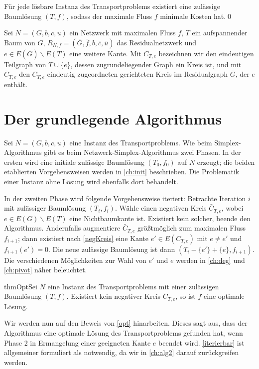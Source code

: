 \begin{kor}\label{TP}Für jede lösbare Instanz des Transportproblems existiert eine zulässige Baumlösung $(T,f)$, sodass der maximale Fluss $f$ minimale Kosten hat.\qed\end{kor}

\begin{nota}Sei $N=(G,b,c,u)$ ein Netzwerk mit maximalen Fluss $f$, $T$ ein aufspannender Baum von $G$, $R_{N,f}=(\bar{G},\bar{f},b,\bar{c},\bar{u})$ das Residualnetzwerk und $e\in E(\bar{G})\backslash E(T)$ eine weitere Kante. Mit $C_{T,e}$ bezeichnen wir den eindeutigen Teilgraph von $T\cup\{e\}$, dessen zugrundeliegender Graph ein Kreis ist, und mit $\bar{C}_{T,e}$ den $C_{T,e}$ eindeutig zugeordneten gerichteten Kreis im Residualgraph $\bar{G}$, der $e$ enthält.\end{nota}

\section{Der grundlegende Algorithmus}\label{ch:alg}

Sei $N=(G,b,c,u)$ eine Instanz des Transportproblems. Wie beim Simplex-Algorithmus gibt es beim Netzwerk-Simplex-Algorithmus zwei Phasen. In der ersten wird eine initiale zulässige Baumlösung $(T_0,f_0)$ auf $N$ erzeugt; die beiden etablierten Vorgehensweisen werden in \cref{ch:init} beschrieben. Die Problematik einer Instanz ohne Lösung wird ebenfalls dort behandelt.

In der zweiten Phase wird folgende Vorgehensweise iteriert: Betrachte Iteration $i$ mit zulässiger Baumlösung $(T_i,f_i)$. Wähle einen negativen Kreis $\bar{C}_{T,e}$, wobei $e\in E(G)\backslash E(T)$ eine Nichtbaumkante ist. Existiert kein solcher, beende den Algorithmus. Andernfalls augmentiere $\bar{C}_{T,e}$ größtmöglich zum maximalen Fluss $f_{i+1}$; dann existiert nach \cref{negKreis} eine Kante $e'\in E(C_{T,e})$ mit $e\neq e'$ und $f_{i+1}(e')=0$. Die neue zulässige Baumlösung ist dann $(T_i-\{e'\}+\{e\},f_{i+1})$. Die verschiedenen Möglichkeiten zur Wahl von $e'$ und $e$ werden in \cref{ch:deg} und \cref{ch:pivot} näher beleuchtet.

\begin{restatable}{thm}{Opt}\label{opt}Sei $N$ eine Instanz des Transportproblems mit einer zulässigen Baumlösung $(T,f)$. Existiert kein negativer Kreis $\bar{C}_{T,e}$, so ist $f$ eine optimale Lösung.\end{restatable}

Wir werden nun auf den Beweis von \cref{opt} hinarbeiten. Dieses sagt aus, dass der Algorithmus eine optimale Lösung des Transportproblems gefunden hat, wenn Phase 2 in Ermangelung einer geeigneten Kante $e$ beendet wird. \cref{iterierbar} ist allgemeiner formuliert als notwendig, da wir in \cref{ch:alg2} darauf zurückgreifen werden.

